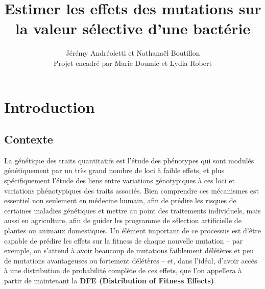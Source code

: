 \documentclass[12pt]{article}
\title{Estimer les effets des mutations sur la valeur sélective d'une bactérie}
\author{Jérémy Andréoletti et Nathanaël Boutillon\\Projet encadré par Marie Doumic et Lydia Robert}
\newcounter{prop}[section]
\begin{document}
\maketitle

%
%
%
%
%

\tableofcontents

\newpage

\FloatBarrier
\section{Introduction}

\subsection{Contexte}

La génétique des traits quantitatifs \cite{mac} est l'étude des phénotypes qui sont modulés génétiquement par un très grand nombre de loci à faible effets, et plus spécifiquement l'étude des liens entre variations génotypiques à ces loci et variations phénotypiques des traits associés. Bien comprendre ces mécanismes est essentiel non seulement en médecine humain, afin de prédire les risques de certaines maladies génétiques et mettre au point des traitements individuels, mais aussi en agriculture, afin de guider les programme de sélection artificielle de plantes ou animaux domestiques. Un élément important de ce processus est d'être capable de prédire les effets sur la fitness de chaque nouvelle mutation -- par exemple, on s'attend à avoir beaucoup de mutations faiblement délétères et peu de mutations avantageuses ou fortement délétères -- et, dans l'idéal, d'avoir accès à une distribution de probabilité complète de ces effets, que l'on appellera à partir de maintenant la \textbf{DFE (Distribution of Fitness Effects)}.
\end{document}
